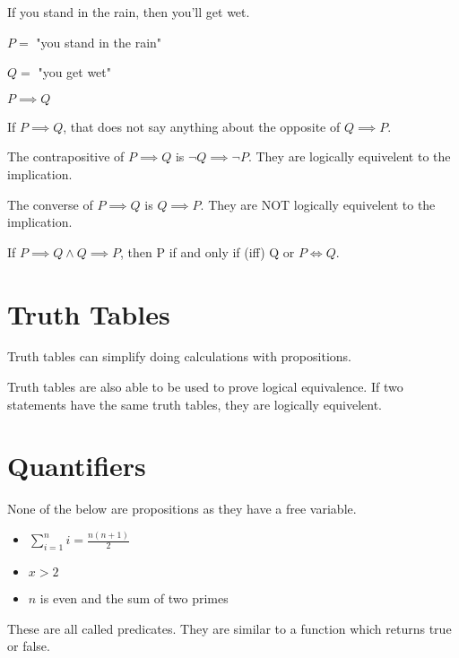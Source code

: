 \begin{example}
  If you stand in the rain, then you'll get wet.

  $P=$ "you stand in the rain"

  $Q=$ "you get wet"

  $P \implies Q$
\end{example}

\begin{note}
  If $P \implies Q$, that does not say anything about the opposite of $Q \implies P$.
\end{note}

\begin{definition}[Contrapositive]
  \label{contra}
The contrapositive of $P \implies Q$ is $\lnot Q \implies \lnot P$.
They are logically equivelent to the implication.
\end{definition}

\begin{definition}[Converse]
The converse of $P \implies Q$ is $Q \implies P$.
They are NOT logically equivelent to the implication.
\end{definition}

\begin{definition}
  If $P\implies Q \land Q \implies P$, then P if and only if (iff) Q or $P \iff Q$.
\end{definition}

\section{Truth Tables}
Truth tables can simplify doing calculations with propositions.

Truth tables are also able to be used to prove logical equivalence.
If two statements have the same truth tables, they are logically equivelent.

\section{Quantifiers}
None of the below are propositions as they have a free variable.
\begin{itemize}
  \item $\sum_{i=1}^{n} i = \frac{n(n+1)}{2}$
  \item $x > 2$
  \item $n$ is even and the sum of two primes
\end{itemize}
These are all called predicates.
They are similar to a function which returns true or false.

